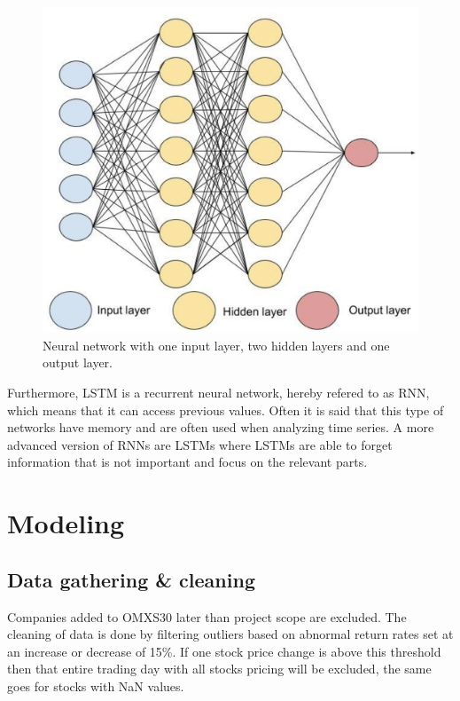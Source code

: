\documentclass[final]{LTHtwocol} %
\begin{document}
\begin{figure}[h]
	\centering
	\includegraphics[width=0.7\columnwidth]{Pics/neuralNet.png}
	\caption{Neural network with one input layer, two hidden layers and one output layer.}
	\label{fig:NN} %
\end{figure}

Furthermore, LSTM is a recurrent neural network, hereby refered to as RNN, which means that it can access previous values. Often it is said that this type of networks have memory and are often used when analyzing time series. A more advanced version of RNNs are LSTMs where LSTMs are able to forget information that is not important and focus on the relevant parts.  \cite{uppsala} 

\section{Modeling}

\subsection{Data gathering \& cleaning}
Companies added to OMXS30 later than project scope are excluded. The cleaning of data is done by filtering outliers based on abnormal return rates set at an increase or decrease of 15\%. If one stock price change is above this threshold then that entire trading day with all stocks pricing will be excluded, the same goes for stocks with NaN values.

\end{document}
